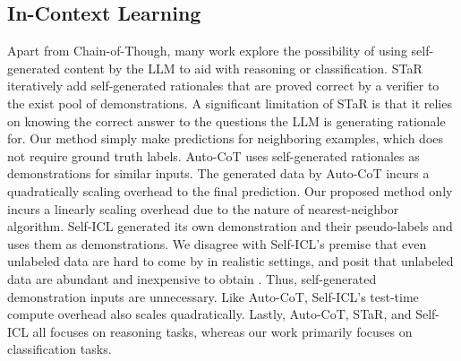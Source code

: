 \subsection{In-Context Learning}
Apart from Chain-of-Though, many work explore the possibility of using self-generated content by the LLM to aid with reasoning or classification. STaR \cite{STaR} iteratively add self-generated rationales that are proved correct by a verifier to the exist pool of demonstrations. A significant limitation of STaR is that it relies on knowing the correct answer to the questions the LLM is generating rationale for. Our method simply make predictions for neighboring examples, which does not require ground truth labels. Auto-CoT\cite{Auto-CoT} uses self-generated rationales as demonstrations for similar inputs. The generated data by Auto-CoT incurs a quadratically scaling overhead to the final prediction. Our proposed method only incurs a linearly scaling overhead due to the nature of nearest-neighbor algorithm. Self-ICL \cite{self-icl} generated its own demonstration and their pseudo-labels and uses them as demonstrations. We disagree with Self-ICL's premise that even unlabeled data are hard to come by in realistic settings, and posit that unlabeled data are abundant and inexpensive to obtain \cite{zou-etal-2023-decrisismb, zou2023semi}. Thus, self-generated demonstration inputs are unnecessary. Like Auto-CoT, Self-ICL's test-time compute overhead also scales quadratically. Lastly, Auto-CoT, STaR, and Self-ICL all focuses on reasoning tasks, whereas our work primarily focuses on classification tasks.




